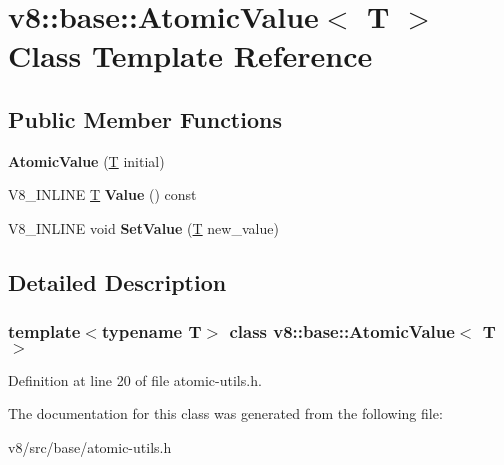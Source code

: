 \hypertarget{classv8_1_1base_1_1AtomicValue}{}\section{v8\+:\+:base\+:\+:Atomic\+Value$<$ T $>$ Class Template Reference}
\label{classv8_1_1base_1_1AtomicValue}
\subsection*{Public Member Functions}
\begin{DoxyCompactItemize}
\item 
\mbox{\label{classv8_1_1base_1_1AtomicValue_a0cddeb99a9dab23c254e187ff65158b0}} 
{\bfseries Atomic\+Value} (\mbox{\hyperlink{classv8_1_1internal_1_1torque_1_1T}{T}} initial)
\item 
\mbox{\label{classv8_1_1base_1_1AtomicValue_a5b0b7d04dd1d7a973646c6944a99dc45}} 
V8\+\_\+\+I\+N\+L\+I\+NE \mbox{\hyperlink{classv8_1_1internal_1_1torque_1_1T}{T}} {\bfseries Value} () const
\item 
\mbox{\label{classv8_1_1base_1_1AtomicValue_a240c79ad957496fdc96157fedaff442a}} 
V8\+\_\+\+I\+N\+L\+I\+NE void {\bfseries Set\+Value} (\mbox{\hyperlink{classv8_1_1internal_1_1torque_1_1T}{T}} new\+\_\+value)
\end{DoxyCompactItemize}


\subsection{Detailed Description}
\subsubsection*{template$<$typename T$>$\newline
class v8\+::base\+::\+Atomic\+Value$<$ T $>$}



Definition at line 20 of file atomic-\/utils.\+h.



The documentation for this class was generated from the following file\+:\begin{DoxyCompactItemize}
\item 
v8/src/base/atomic-\/utils.\+h\end{DoxyCompactItemize}
